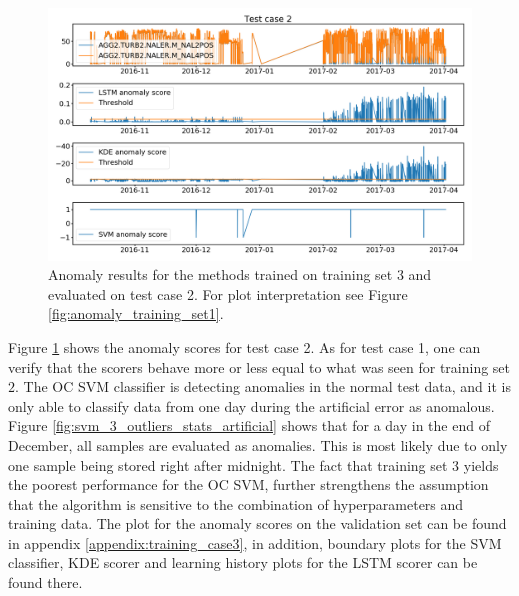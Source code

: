         \begin{figure}[h!]
            \centering
            \includegraphics[width=\textwidth]{report/figures/analysis/plant2_train_long/artificial_data_anomaly.png}
            \caption{Anomaly results for the methods trained on training set 3 and evaluated on test case 2. For plot interpretation see Figure \ref{fig:anomaly_training_set1}.}
            \label{fig:plan3_long_arti_anomaly_score}
        \end{figure}
        Figure \ref{fig:plan3_long_arti_anomaly_score} shows the anomaly scores for test case 2. As for test case 1, one can verify that the scorers behave more or less equal to what was seen for training set $2$. The OC SVM classifier is detecting anomalies in the normal test data, and it is only able to classify data from one day during the artificial error as anomalous. Figure \ref{fig:svm_3_outliers_stats_artificial} shows that for a day in the end of December, all samples are evaluated as anomalies. This is most likely due to only one sample being stored right after midnight. The fact that training set 3 yields the poorest performance for the OC SVM, further strengthens the assumption that the algorithm is sensitive to the combination of hyperparameters and training data. The plot for the anomaly scores on the validation set can be found in appendix \ref{appendix:training_case3}, in addition, boundary plots for the SVM classifier, KDE scorer and learning history plots for the LSTM scorer can be found there.
        
